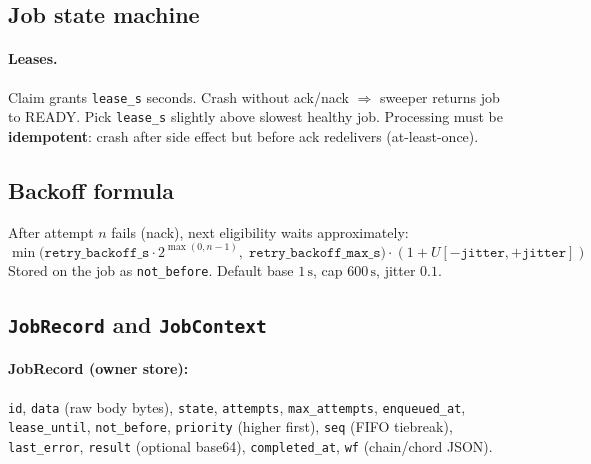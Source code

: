 \documentclass[11pt,a4paper]{article}
\begin{document}
\subsection{Job state machine}

\begin{center}
\end{center}

\paragraph{Leases.} Claim grants \texttt{lease\_s} seconds. Crash without ack/nack
$\Rightarrow$ sweeper returns job to READY. Pick \texttt{lease\_s} slightly above
slowest healthy job. Processing must be \textbf{idempotent}: crash after side
effect but before ack redelivers (at-least-once).

\subsection{Backoff formula}

After attempt $n$ fails (nack), next eligibility waits approximately:
\[
\min\!\bigl(\texttt{retry\_backoff\_s}\cdot 2^{\max(0,n-1)},\;
\texttt{retry\_backoff\_max\_s}\bigr)
\cdot (1 + U[-\texttt{jitter},+\texttt{jitter}])
\]
Stored on the job as \texttt{not\_before}. Default base $1\,\mathrm{s}$, cap
$600\,\mathrm{s}$, jitter $0.1$.

\subsection{\texttt{JobRecord} and \texttt{JobContext}}

\paragraph{JobRecord (owner store):}
\texttt{id}, \texttt{data} (raw body bytes), \texttt{state}, \texttt{attempts},
\texttt{max\_attempts}, \texttt{enqueued\_at}, \texttt{lease\_until},
\texttt{not\_before}, \texttt{priority} (higher first), \texttt{seq} (FIFO
tiebreak), \texttt{last\_error}, \texttt{result} (optional base64),
\texttt{completed\_at}, \texttt{wf} (chain/chord JSON).
\end{document}

